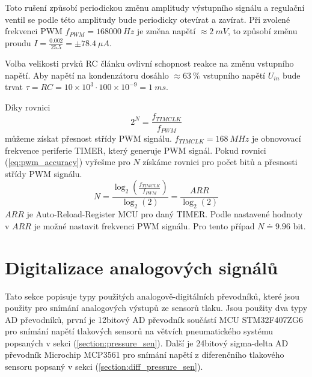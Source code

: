 Toto rušení způsobí periodickou změnu amplitudy výstupního signálu a regulační ventil se podle této amplitudy bude periodicky otevírat a zavírat. Při zvolené frekvenci PWM $f_{PWM} = 168000 \ Hz $ je změna napětí $\approx 2 \ mV$, to způsobí změnu proudu $I = \frac{0.002}{25.5} = \pm 78.4 \ \mu A $. \par
Volba velikosti prvků RC článku ovlivní schopnost reakce na změnu vstupního napětí.
Aby napětí na kondenzátoru dosáhlo $\approx 63 \ \% $ vstupního napětí $U_{in}$ bude trvat $\tau = RC = 10 \times 10^{3} \cdot 100 \times 10^{-9}= 1 \ ms$.

\par
Díky rovnici
\begin{equation} \label{eq:pwm_accuracy}
    2^N = \frac{f_{TIMCLK}}{f_{PWM}}
\end{equation}
můžeme získat přesnost střídy PWM signálu. $f_{TIMCLK} = 168 \ MHz$ je obnovovací frekvence periferie TIMER, který generuje PWM signál. Pokud rovnici (\ref{eq:pwm_accuracy}) vyřešme pro $N$ získáme rovnici pro počet bitů a přesnosti střídy PWM signálu.
\begin{equation}
    N = \frac{\log_{2} (\frac{f_{TIMCLK}}{f_{PWM}})}{\log_{2}(2)} = \frac{ARR}{\log_{2}(2)}
\end{equation}
$ARR$ je Auto-Reload-Register MCU pro daný TIMER. Podle nastavené hodnoty v $ARR$ je možné nastavit frekvenci PWM signálu. Pro tento případ $N \doteq 9.96 $ bit.

\section{Digitalizace analogových signálů}
Tato sekce popisuje typy použitých analogově-digitálních převodníků, které jsou použity pro snímání analogových výstupů ze sensorů tlaku. Jsou použity dva typy AD převodníků, první je 12bitový AD převodník součástí MCU STM32F407ZG6 pro snímání napětí tlakových sensorů na větvích pneumatického systému popsaných v sekci (\ref{section:pressure_sen}).
Další je 24bitový sigma-delta AD převodník Microchip MCP3561 pro snímání napětí z diferenčního tlakového sensoru popsaný v sekci (\ref{section:diff_pressure_sen}).


